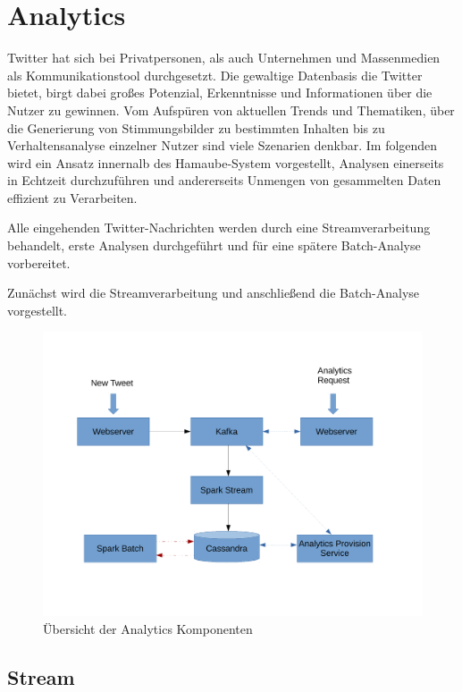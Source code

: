 

\chapter{Analytics}
\label{Analytics}

Twitter hat sich bei Privatpersonen, als auch Unternehmen und Massenmedien als Kommunikationstool durchgesetzt.
Die gewaltige Datenbasis die Twitter bietet, birgt dabei großes Potenzial, Erkenntnisse und Informationen über die Nutzer zu gewinnen.
Vom Aufspüren von aktuellen Trends und Thematiken, über die Generierung von Stimmungsbilder zu bestimmten Inhalten bis zu Verhaltensanalyse einzelner Nutzer sind viele Szenarien denkbar.
Im folgenden wird ein Ansatz innernalb des Hamaube-System vorgestellt, Analysen einerseits in Echtzeit durchzuführen und andererseits Unmengen von gesammelten Daten effizient zu Verarbeiten.

Alle eingehenden Twitter-Nachrichten werden durch eine Streamverarbeitung behandelt, erste Analysen durchgeführt und für eine spätere Batch-Analyse vorbereitet.

Zunächst wird die Streamverarbeitung und anschließend die Batch-Analyse vorgestellt.

\begin{figure}[htbp!]
	\centering
	\includegraphics[width=\textwidth]{pics/analytics/archi}
	\caption{Übersicht der Analytics Komponenten}
\end{figure}

\section{Stream}

